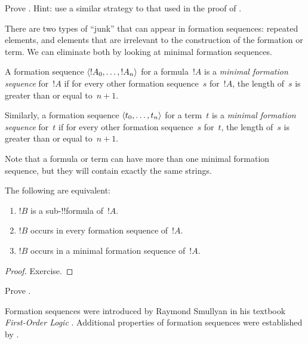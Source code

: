 \documentclass[../../../include/open-logic-section]{subfiles}
\begin{document}
\begin{prob}
Prove .
Hint: use a similar strategy to that used in the proof of
.
\end{prob}

There are two types of ``junk'' that can appear in formation
sequences: repeated elements, and elements that are irrelevant
to the construction of the formation or term. We can eliminate
both by looking at minimal formation sequences.

\begin{defn}
A formation sequence $\langle !A_0, \ldots, !A_n \rangle$ for a
formula~$!A$ is a \emph{minimal formation sequence} for~$!A$
if for every other formation sequence~$s$ for~$!A$,
the length of~$s$ is greater than or equal to~$n+1$.

Similarly, a formation sequence $\langle t_0, \ldots, t_n \rangle$
for a term~$t$ is a \emph{minimal formation sequence}
for~$t$ if for every other formation sequence~$s$ for~$t$,
the length of~$s$ is greater than or equal to~$n+1$.
\end{defn}

Note that a formula or term can have more than one minimal
formation sequence, but they will contain exactly the same
strings.

\begin{prop}
The following are equivalent:
\begin{enumerate}
    \item $!B$ is a sub-!!{formula} of~$!A$.
    \item $!B$ occurs in every formation sequence of~$!A$.
    \item $!B$ occurs in a minimal formation sequence of~$!A$.
\end{enumerate}
\end{prop}

\begin{proof}
Exercise.
\end{proof}

\begin{prob}
Prove .
\end{prob}

\begin{history}
Formation sequences were introduced by Raymond Smullyan in his
textbook \emph{First-Order Logic} \citep{Smullyan1968}.
Additional properties of formation sequences were established by
\citet{Zuckerman1973}.
\end{history}
\end{document}
